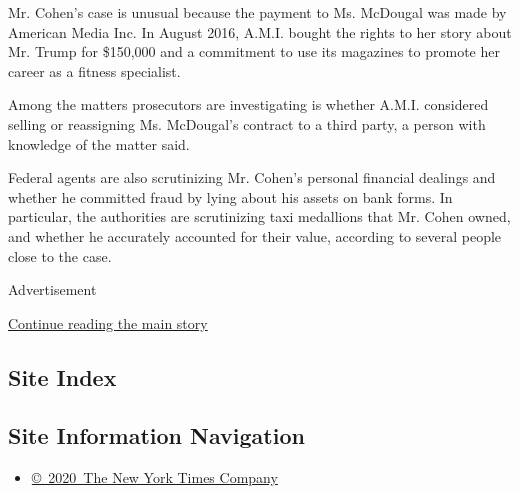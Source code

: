 Mr. Cohen's case is unusual because the payment to Ms. McDougal was made
by American Media Inc. In August 2016, A.M.I. bought the rights to her
story about Mr. Trump for \$150,000 and a commitment to use its
magazines to promote her career as a fitness specialist.

Among the matters prosecutors are investigating is whether A.M.I.
considered selling or reassigning Ms. McDougal's contract to a third
party, a person with knowledge of the matter said.

Federal agents are also scrutinizing Mr. Cohen's personal financial
dealings and whether he committed fraud by lying about his assets on
bank forms. In particular, the authorities are scrutinizing taxi
medallions that Mr. Cohen owned, and whether he accurately accounted for
their value, according to several people close to the case.

Advertisement

\protect\hyperlink{after-bottom}{Continue reading the main story}

\hypertarget{site-index}{%
\subsection{Site Index}\label{site-index}}

\hypertarget{site-information-navigation}{%
\subsection{Site Information
Navigation}\label{site-information-navigation}}

\begin{itemize}
\tightlist
\item
  \href{https://help.nytimes3xbfgragh.onion/hc/en-us/articles/115014792127-Copyright-notice}{©~2020~The
  New York Times Company}
\end{itemize}


